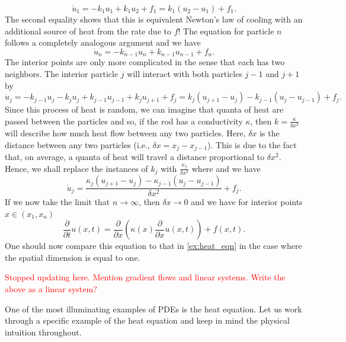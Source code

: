     \begin{equation}
        \dot{u}_1 = -k_1 u_1 + k_1 u_2 + f_1= k_1(u_2-u_1)+f_1.
    \end{equation}
        The second equality shows that this is equivalent Newton's law of cooling with an additional source of heat from the rate due to $f$! The equation for particle $n$ follows a completely analogous argument and we have
\begin{equation}
    \dot{u}_n = -k_{n-1} u_n + k_{n-1} u_{n-1} + f_n.
\end{equation}
        The interior points are only more complicated in the sense that each has two neighbors. The interior particle $j$ will interact with both particles $j-1$ and $j+1$ by
 \begin{equation}
\dot{u}_j = -k_{j-1} u_j - k_j u_j + k_{j-1} u_{j-1} + k_j u_{j+1} + f_j = k_j (u_{j+1}-u_j) - k_{j-1}(u_j-u_{j-1}) + f_j.
\end{equation}
Since this process of heat is random, we can imagine that quanta of heat are passed between the particles and so, if the rod has a conductivity $\kappa$, then $k = \frac{\kappa}{\delta x^2}$ will describe how much heat flow between any two particles. Here, $\delta x$ is the distance between any two particles (i.e., $\delta x = x_j-x_{j-1}$). This is due to the fact that, on average, a quanta of heat will travel a distance proportional to $\delta x^2$. Hence, we shall replace the instances of $k_j$ with $\frac{\kappa_j}{\delta x^2}$ where and we have
\begin{equation}
\dot{u}_j = \frac{ \kappa_j (u_{j+1}-u_j) - \kappa_{j-1}(u_j-u_{j-1})}{\delta x^2} + f_j.
\end{equation}
If we now take the limit that $n\to \infty$, then $\delta x \to 0$ and we have for interior points $x\in (x_1,x_n)$
\begin{equation}
\frac{\partial}{\partial t} u(x,t) = \frac{\partial}{\partial x} \left( \kappa(x) \frac{\partial}{\partial x} u(x,t)\right) + f(x,t).
\end{equation}
One should now compare this equation to that in \cref{ex:heat_eqn} in the case where the spatial dimension is equal to one.

        
\textcolor{red}{Stopped updating here. Mention gradient flows and linear systems. Write the above as a linear system?}
        
        One of the most illuminating examples of PDEs is the heat equation.  Let us work through a specific example of the heat equation and keep in mind the physical intuition throughout.
        
